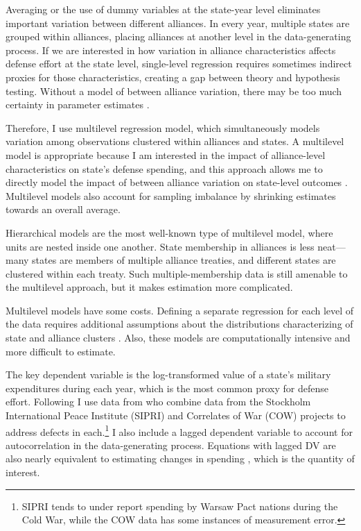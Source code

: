 \documentclass[12pt]{article}
\begin{document}
Averaging or the use of dummy variables at the state-year level eliminates important variation between different alliances. In every year, multiple states are grouped within alliances, placing alliances at another level in the data-generating process. If we are interested in how variation in alliance characteristics affects defense effort at the state level, single-level regression requires sometimes indirect proxies for those characteristics, creating a gap between theory and hypothesis testing. Without a model of between alliance variation, there may be too much certainty in parameter estimates \citep{McElreath2016}. 

Therefore, I use multilevel regression model, which simultaneously models variation among observations clustered within alliances and states. A multilevel model is appropriate because I am interested in the impact of \textsf{alliance-level} characteristics on state's defense spending, and this approach allows me to directly model the impact of between alliance variation on state-level outcomes \citep{GelmanHill2007}. Multilevel models also account for sampling imbalance by shrinking estimates towards an overall average. 

Hierarchical models are the most well-known type of multilevel model, where units are nested inside one another. State membership in alliances is less neat--- many states are members of multiple alliance treaties, and different states are clustered within each treaty. Such multiple-membership data is still amenable to the multilevel approach, but it makes estimation more complicated. 

Multilevel models have some costs. Defining a separate regression for each level of the data requires additional assumptions about the distributions characterizing of state and alliance clusters \citep{McElreath2016}. Also, these models are computationally intensive and more difficult to estimate. 

The key dependent variable is the log-transformed value of a state's military expenditures during each year, which is the most common proxy for defense effort. Following\citet{DigiuseppePoast2016} I use data from \citet{Nordhausetal2012} who combine data from the Stockholm International Peace Institute (SIPRI) and Correlates of War (COW) projects to address defects in each.\footnote{SIPRI tends to under report spending by Warsaw Pact nations during the Cold War, while the COW data has some instances of measurement error.} I also include a lagged dependent variable to account for autocorrelation in the data-generating process. Equations with lagged DV are also nearly equivalent to estimating changes in spending \citep{DeBoefKeele2008}, which is the quantity of interest. 
\end{document}
